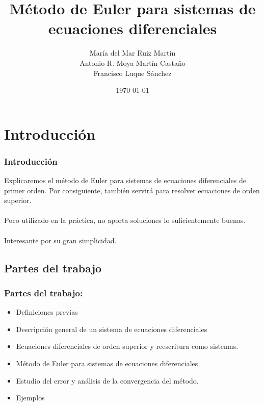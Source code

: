 \documentclass{beamer}
\title[Método de Euler para sist. de ecuaciones]{Método de Euler para sistemas de ecuaciones diferenciales} %
\author{María del Mar Ruiz Martín\\
        Antonio R. Moya Martín-Castaño\\
        Francisco Luque Sánchez} %
\institute[UGR] %
{
  Universidad de Granada \\ %
}
\date{\today} %
\begin{document}
\begin{frame}
\titlepage 
\end{frame}


\section{Introducción}
\begin{frame}
  \frametitle{Introducción}
  Explicaremos el método de Euler para sistemas de ecuaciones diferenciales de primer orden. Por consiguiente, también servirá para resolver ecuaciones de orden superior.\\~\\
  
  Poco utilizado en la práctica, no aporta soluciones lo suficientemente buenas.\\~\\

  Interesante por su gran simplicidad.
  
\end{frame}


\subsection{Partes del trabajo}
\begin{frame}
	\frametitle{Partes del trabajo:}
	\begin{itemize}
		\item Definiciones previas
		\item Descripción general de un sistema de ecuaciones diferenciales
		\item Ecuaciones diferenciales de orden superior y reescritura como sistemas.
		\item Método de Euler para sistemas de ecuaciones diferenciales
		\item Estudio del error y análisis de la convergencia del método.
		\item Ejemplos
		
	\end{itemize}
\end{frame}
\end{document}
